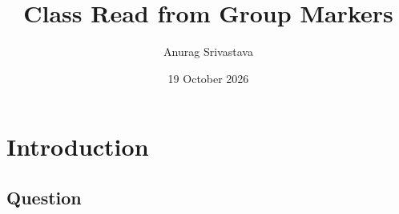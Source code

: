\makeatletter
\g@addto@macro\UrlBreaks{\do\.\do\_\do\,}
\makeatother
\newcommand{\lean}[1]{\path{#1}}
\newcommand{\rowref}[1]{#1}
\newcommand{\unv}[1]{\textit{Unverified:} #1}
\newcommand{\pend}[1]{\textit{Pending:} #1}

\newcommand{\krow}[4]{#1 & #2 & \rowref{#3} & #4 \\ \addlinespace}
\newcommand{\prow}[6]{#1 & #2 & #3 & #4 & #5 & \rowref{#6} \\ \addlinespace}
\newcommand{\arow}[6]{#1 & #2 & #3 & #4 & \rowref{#5} & #6 \\ \addlinespace}
\newcommand{\mrow}[4]{#1 & #2 & #3 & \lean{#4} & p.~\pageref{proof:#1} \\ \addlinespace}
\newcommand{\lrow}[6]{#1 & \citet{#2} & #3 & ``#4'' & #5 & \rowref{#6} \\ \addlinespace}
\newcommand{\crow}[3]{#1 & #2 & \rowref{#3} \\ \addlinespace}
\newcommand{\irow}[5]{#1 & #2 & \rowref{#3} & #4 & #5 \\ \addlinespace}
\newcommand{\mm}[6]{#1 & \textbf{#2} & #3 & #4 & #5 & #6 \\ \addlinespace}

\newenvironment{mproof}[2]
  {\subsection*{Proof of #1}\label{proof:#1}%
   {\raggedright\noindent\textit{Lean:} \lean{#2}.\par}\smallskip}
  {\par\hfill$\square$\par\medskip}

\title{Class Read from Group Markers}
\author{Anurag Srivastava}
\date{19 October 2026}


\maketitle

\section{Introduction}

\subsection{Question}


